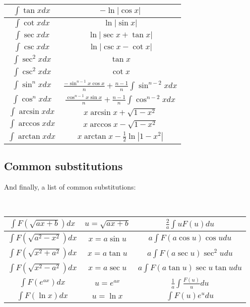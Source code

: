 \documentclass[a4paper]{amsart}
\begin{document}
\begin{multicols}{2}
      \begin{tabular}{|c|c|}
        \hline 
        $\int \tan x dx$ & $-\ln |\cos x|$ \\ \hline
        $\int \cot x dx$ & $\ln |\sin x|$ \\ \hline
        $\int \sec x dx$ & $\ln |\sec x + \tan x|$ \\ \hline
        $\int \csc x dx$ & $\ln |\csc x - \cot x|$ \\ \hline
        $\int \sec^2 x dx$ & $\tan x$ \\ \hline
        $\int \csc^2 x dx$ & $\cot x$ \\ \hline
        $\int \sin^n x dx$ & $\frac{-\sin^{n-1} x \cos x}{n} + \frac{n-1}{n}\int \sin^{n-2}x dx$ \\ \hline
        $\int \cos^n x dx$ & $\frac{\cos^{n-1} x \sin x}{n} + \frac{n-1}{n}\int \cos^{n-2}x dx$ \\ \hline        
        $\int \arcsin x dx$ & $x \arcsin x + \sqrt{1 - x^2}$ \\ \hline
        $\int \arccos x dx$ & $x \arccos x - \sqrt{1 - x^2}$ \\ \hline
        $\int \arctan x dx$ & $x \arctan x - \frac{1}{2} \ln |1 - x^2|$ \\ \hline
      \end{tabular}

    \subsection{Common substitutions} And finally, a list of common substitutions:

      \ 

      \begin{tabular}{|c|c|c|}
        \hline 
        $\int F(\sqrt{ax + b}) dx$ & $u = \sqrt{ax + b}$ & $\frac{2}{a} \int u F(u) du$ \\ \hline
        $\int F(\sqrt{a^2 - x^2}) dx$ & $x = a \sin u$ & $a \int F(a \cos u) \cos u du$ \\ \hline
        $\int F(\sqrt{x^2 + a^2}) dx$ & $x = a \tan u$ & $a \int F(a \sec u) \sec^2 u du$ \\ \hline
        $\int F(\sqrt{x^2 - a^2}) dx$ & $x = a \sec u$ & $a \int F(a \tan u) \sec u \tan u du$ \\ \hline
        $\int F(e^{ax}) dx$ & $u = e^{ax}$ & $\frac{1}{a} \int \frac{F(u)}{u} du$ \\ \hline
        $\int F(\ln x) dx$ & $u = \ln x$ & $\int F(u) e^u du$ \\ \hline
      \end{tabular}
  \end{multicols}
\end{document}
